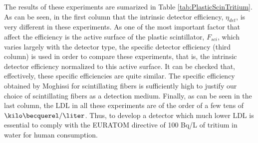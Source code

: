 
The results of these experiments are sumarized in Table \ref{tab:PlasticScinTritium}. As can be seen, in the first column that the intrinsic detector efficiency, $\eta_{det}$, is very different in these experiments. As one of the most important factor that affect the efficiency is the active surface of the plastic scintillator, $F_{sci}$, which varies largely with the detector type, the specific detector efficiency (third column) is used in order to compare these experiments, that is, the intrinsic detector efficiency normalized to this active surface. It can be checked that, effectively, these specific efficiencies are quite similar. The specific efficiency obtained by Moghissi for scintillating fibers is sufficiently high to justify our choice of scintillating fibers as a detection medium. Finally, as can be seen in the last column, the LDL in all these experiments are of the order of a few tens of $\kilo\becquerel/\liter$. Thus, to develop a detector which much lower LDL is essential to comply with the EURATOM directive of 100 Bq/L of tritium in water for human consumption.
